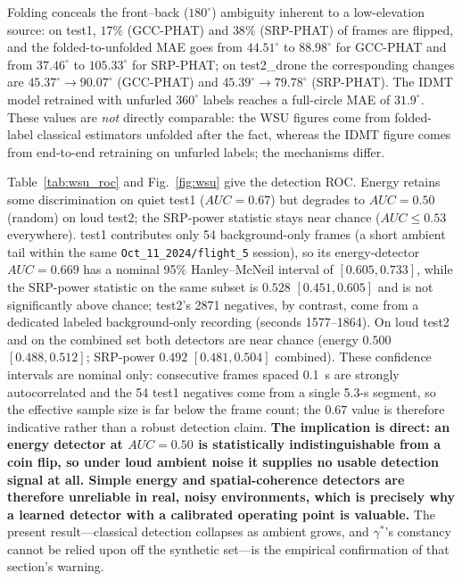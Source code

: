 \documentclass[sensors,article,submit,pdftex,moreauthors]{Definitions/mdpi}
\begin{document}
Folding conceals the front--back ($180^\circ$) ambiguity inherent to a low-elevation source: on test1, $17\%$ (GCC-PHAT) and $38\%$ (SRP-PHAT) of frames are flipped, and the folded-to-unfolded MAE goes from $44.51^\circ$ to $88.98^\circ$ for GCC-PHAT and from $37.46^\circ$ to $105.33^\circ$ for SRP-PHAT; on test2\_drone the corresponding changes are $45.37^\circ\to90.07^\circ$ (GCC-PHAT) and $45.39^\circ\to79.78^\circ$ (SRP-PHAT). The IDMT model retrained with unfurled $360^\circ$ labels reaches a full-circle MAE of $31.9^\circ$. These values are \emph{not} directly comparable: the WSU figures come from folded-label classical estimators unfolded after the fact, whereas the IDMT figure comes from end-to-end retraining on unfurled labels; the mechanisms differ.

Table~\ref{tab:wsu_roc} and Fig.~\ref{fig:wsu} give the detection ROC. Energy retains some discrimination on quiet test1 ($AUC=0.67$) but degrades to $AUC=0.50$ (random) on loud test2; the SRP-power statistic stays near chance ($AUC\le0.53$ everywhere). test1 contributes only \num{54} background-only frames (a short ambient tail within the same \texttt{Oct\_11\_2024/flight\_5} session), so its energy-detector $AUC=0.669$ has a nominal 95\% Hanley--McNeil interval of $[0.605,0.733]$, while the SRP-power statistic on the same subset is $0.528$ $[0.451,0.605]$ and is not significantly above chance; test2's \num{2871} negatives, by contrast, come from a dedicated labeled background-only recording (seconds 1577--1864). On loud test2 and on the combined set both detectors are near chance (energy $0.500$ $[0.488,0.512]$; SRP-power $0.492$ $[0.481,0.504]$ combined). These confidence intervals are nominal only: consecutive frames spaced \SI{0.1}{\s} are strongly autocorrelated and the \num{54} test1 negatives come from a single 5.3-s segment, so the effective sample size is far below the frame count; the $0.67$ value is therefore indicative rather than a robust detection claim. \textbf{The implication is direct: an energy detector at $AUC=0.50$ is statistically indistinguishable from a coin flip, so under loud ambient noise it supplies no usable detection signal at all. Simple energy and spatial-coherence detectors are therefore unreliable in real, noisy environments, which is precisely why a learned detector with a calibrated operating point is valuable.} The present result---classical detection collapses as ambient grows, and $\gamma^*$'s constancy cannot be relied upon off the synthetic set---is the empirical confirmation of that section's warning.
\end{document}
